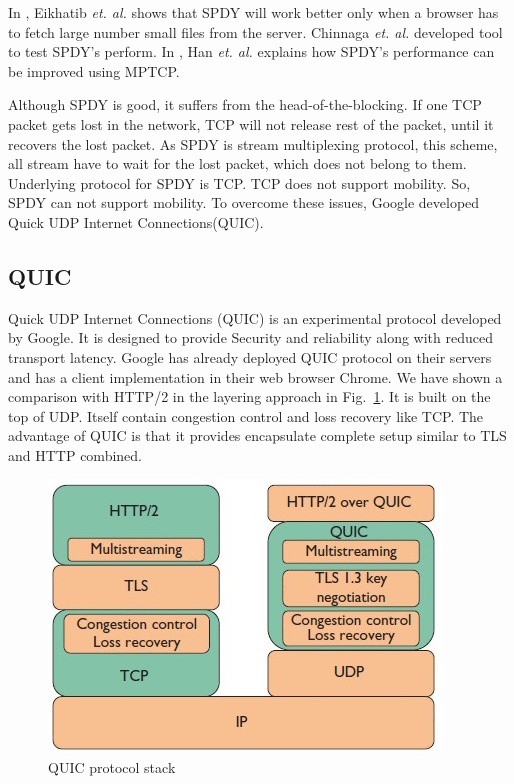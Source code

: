 In \cite{canspdymake}, Eikhatib \textit{et. al.} shows that SPDY will work better only when a browser has to fetch large number small files from the server. Chinnaga \textit{et. al.} developed tool to test SPDY's perform\cite{scalabilitySPDY}. In \cite{han2015anatomy}, Han \textit{et. al.} explains how SPDY's performance can be improved using MPTCP.

Although SPDY is good, it suffers from the head-of-the-blocking. If one TCP packet gets lost in the network, TCP will not release rest of the packet, until it recovers the lost packet. As SPDY is stream multiplexing protocol, this scheme, all stream have to wait for the lost packet, which does not belong to them. Underlying protocol for SPDY is TCP. TCP does not support mobility. So, SPDY can not support mobility. To overcome these issues, Google developed Quick UDP Internet Connections(QUIC).

\subsection{QUIC}
Quick UDP Internet Connections (QUIC) is an experimental
protocol developed by Google. It is designed to provide
Security and reliability along with reduced transport latency. Google has already deployed QUIC protocol on their servers and has a client implementation in their web browser Chrome. We have shown a comparison with HTTP/2 in the layering approach in Fig.~\ref{fig:quic-protocolstack}. It is built on the top of UDP. Itself contain congestion control and loss recovery like TCP. The advantage of QUIC is that it provides encapsulate complete setup similar to TLS and HTTP combined.

\begin{figure}[h]
    \centering
    \includegraphics[width=0.7\linewidth]{img/quic/quic-protocolstack}
    \caption{QUIC protocol stack}
    \label{fig:quic-protocolstack}
\end{figure}


